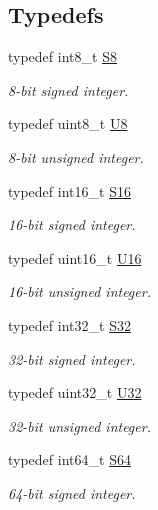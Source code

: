 \subsection*{Typedefs}
\begin{DoxyCompactItemize}
\item 
typedef int8\+\_\+t \mbox{\hyperlink{group__group__sam0__utils_gaf1475a0bb1962ef08dd1f78bd5dba87a}{S8}}
\begin{DoxyCompactList}\small\item\em 8-\/bit signed integer. \end{DoxyCompactList}\item 
typedef uint8\+\_\+t \mbox{\hyperlink{group__group__sam0__utils_gaa63ef7b996d5487ce35a5a66601f3e73}{U8}}
\begin{DoxyCompactList}\small\item\em 8-\/bit unsigned integer. \end{DoxyCompactList}\item 
typedef int16\+\_\+t \mbox{\hyperlink{group__group__sam0__utils_ga6d241ad21a823c90d4835380787db5d4}{S16}}
\begin{DoxyCompactList}\small\item\em 16-\/bit signed integer. \end{DoxyCompactList}\item 
typedef uint16\+\_\+t \mbox{\hyperlink{group__group__sam0__utils_ga0a0a322d5fa4a546d293a77ba8b4a71f}{U16}}
\begin{DoxyCompactList}\small\item\em 16-\/bit unsigned integer. \end{DoxyCompactList}\item 
typedef int32\+\_\+t \mbox{\hyperlink{group__group__sam0__utils_ga39c786017723555afb9e8b85accec0de}{S32}}
\begin{DoxyCompactList}\small\item\em 32-\/bit signed integer. \end{DoxyCompactList}\item 
typedef uint32\+\_\+t \mbox{\hyperlink{group__group__sam0__utils_ga696390429f2f3b644bde8d0322a24124}{U32}}
\begin{DoxyCompactList}\small\item\em 32-\/bit unsigned integer. \end{DoxyCompactList}\item 
typedef int64\+\_\+t \mbox{\hyperlink{group__group__sam0__utils_ga1d293e5c494dd6826239b02f5fe98e7f}{S64}}
\begin{DoxyCompactList}\small\item\em 64-\/bit signed integer. \end{DoxyCompactList}\item 

\end{DoxyCompactItemize}
